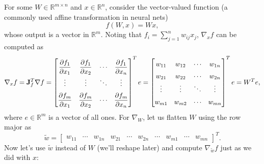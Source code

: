 For some $W \in \mathbb{R}^{m \times n}$ and $x \in \mathbb{R}^n$, consider the vector-valued function (a commonly used affine transformation in neural nets)
$$
f(W, x) = Wx,
$$
whose output is a vector in $\mathbb{R}^m$. Noting that $f_i = \sum_{j=1}^n w_{ij} x_j$, $\nabla_x f$ can be computed as
$$
\renewcommand{\arraystretch}{2}
\nabla_x f = \J_f^T \nabla f =
\begin{bmatrix}
    \dfrac{\partial f_1}{\partial x_1} & \dfrac{\partial f_1}{\partial x_2} & \cdots & \dfrac{\partial f_1}{\partial x_n} \\
    \vdots & \vdots & \ddots & \vdots \\
    \dfrac{\partial f_m}{\partial x_1} & \dfrac{\partial f_m}{\partial x_2} & \cdots & \dfrac{\partial f_m}{\partial x_n}
\end{bmatrix}^T e
\renewcommand{\arraystretch}{1.5}
= \begin{bmatrix}
    w_{11} & w_{12} & \cdots & w_{1n} \\
    w_{21} & w_{22} & \cdots & w_{2n} \\
    \vdots & \vdots & \ddots & \vdots \\
    w_{m1} & w_{m2} & \cdots & w_{mn} \\
\end{bmatrix}^T e = W^T e,
$$
where $e \in \mathbb{R}^m$ is a vector of all ones. For $\nabla_W$, let us flatten $W$ using the row major as
$$
\widetilde{w} = \begin{bmatrix}
    w_{11} & \cdots & w_{1n} & w_{21} & \cdots & w_{2n} & \cdots & w_{m1} & \cdots & w_{mn}
    \end{bmatrix}^T.
$$
Now let's use $\widetilde{w}$ instead of $W$ (we'll reshape later) and compute $\nabla_{\widetilde{w}} f$ just as we did with $x$:
